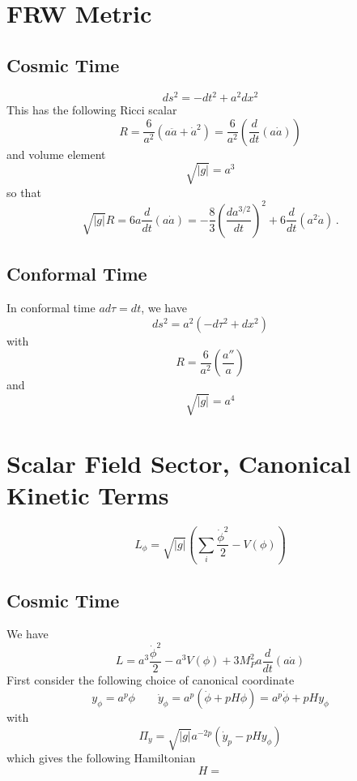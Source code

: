 \documentclass{article}
\begin{document}
\section{FRW Metric}
\subsection{Cosmic Time}
\begin{equation}
  ds^2 = -dt^2 + a^2dx^2
\end{equation}
This has the following Ricci scalar
\begin{equation}
  R = \frac{6}{a^2}\left(a\ddot{a} + \dot{a}^2\right) = \frac{6}{a^2}\left(\frac{d}{dt}\left(a\dot{a}\right)\right)
\end{equation}
and volume element
\begin{equation}
  \sqrt{|g|} = a^3
\end{equation}
so that
\begin{equation}
  \sqrt{|g|}R = 6a\frac{d}{dt}(a\dot{a}) = -\frac{8}{3}\left(\frac{da^{3/2}}{dt}\right)^2 + 6\frac{d}{dt}(a^2\dot{a}) \, .
\end{equation}

\subsection{Conformal Time}
In conformal time $ad\tau = dt$, we have
\begin{equation}
  ds^2 = a^2\left(-d\tau^2 + dx^2\right)
\end{equation}
with
\begin{equation}
  R = \frac{6}{a^2}\left(\frac{a''}{a}\right)
\end{equation}
and
\begin{equation}
  \sqrt{|g|} = a^4
\end{equation}

\section{Scalar Field Sector, Canonical Kinetic Terms}
\begin{equation}
  L_\phi = \sqrt{|g|}\left(\sum_i\frac{\dot{\phi}^2}{2} - V(\phi)\right)
\end{equation}
\subsection{Cosmic Time}
We have
\begin{equation}
  L = a^3\frac{\dot{\phi}^2}{2} - a^3V(\phi) + 3M_P^2 a\frac{d}{dt}(a\dot{a})
\end{equation}
First consider the following choice of canonical coordinate
\begin{equation}
  y_\phi = a^p\phi \qquad \dot{y}_\phi = a^{p}\left(\dot{\phi} + pH\phi\right) = a^p\dot{\phi} + pHy_\phi
\end{equation}
with
\begin{equation}
  \Pi_y = \sqrt{|g|}a^{-2p}\left(\dot{y}_p - pHy_\phi\right)
\end{equation}
which gives the following Hamiltonian
\begin{equation}
  H = 
\end{equation}
\end{document}
